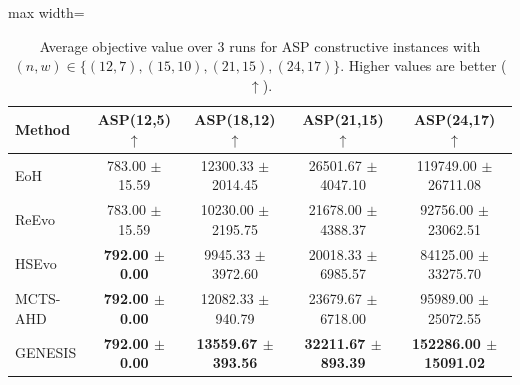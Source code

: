 \documentclass[sigconf,anonymous]{aamas}
\begin{document}
\begin{table}[!htbp]
\centering
\scriptsize
\setlength{\tabcolsep}{3pt}

\setlength{\tabcolsep}{2pt}
\caption{Average objective value over 3 runs for ASP constructive instances with $(n,w) \in \{(12,7),(15,10),(21,15),(24,17)\}$. Higher values are better ($\uparrow$).}
\label{tab:asp_constructive}
\begin{adjustbox}{max width=\columnwidth}
\begin{tabular}{@{}lcccc@{}}
\toprule
Method 
& ASP(12,5) $\uparrow$ 
& ASP(18,12) $\uparrow$ 
& ASP(21,15) $\uparrow$ 
& ASP(24,17) $\uparrow$ \\
\midrule
EoH      & 783.00 $\pm$ 15.59 & 12300.33 $\pm$ 2014.45 & 26501.67 $\pm$ 4047.10 & 119749.00 $\pm$ 26711.08 \\
ReEvo    & 783.00 $\pm$ 15.59 & 10230.00 $\pm$ 2195.75 & 21678.00 $\pm$ 4388.37 & 92756.00 $\pm$ 23062.51 \\
HSEvo    & \textbf{792.00 $\pm$ 0.00} & 9945.33 $\pm$ 3972.60 & 20018.33 $\pm$ 6985.57 & 84125.00 $\pm$ 33275.70 \\
MCTS-AHD & \textbf{792.00 $\pm$ 0.00} & 12082.33 $\pm$ 940.79 & 23679.67 $\pm$ 6718.00 & 95989.00 $\pm$ 25072.55 \\
GENESIS  & \textbf{792.00 $\pm$ 0.00} & \textbf{13559.67 $\pm$ 393.56} & \textbf{32211.67 $\pm$ 893.39} & \textbf{152286.00 $\pm$ 15091.02} \\
\bottomrule
\end{tabular}
\end{adjustbox}
\end{table}
\fi
\end{document}
